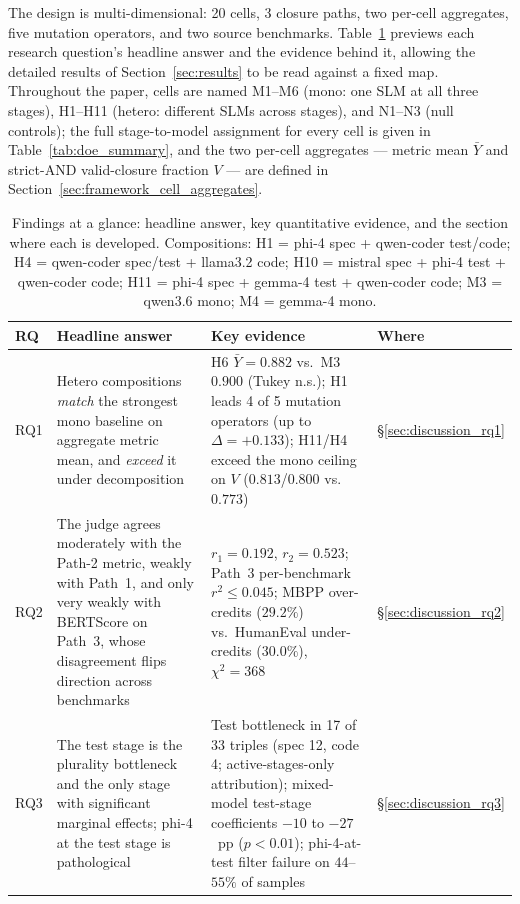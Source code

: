 The design is multi-dimensional: 20 cells, 3 closure paths, two per-cell aggregates, five mutation operators, and two source benchmarks. Table~\ref{tab:findings_glance} previews each research question's headline answer and the evidence behind it, allowing the detailed results of Section~\ref{sec:results} to be read against a fixed map. Throughout the paper, cells are named M1--M6 (mono: one SLM at all three stages), H1--H11 (hetero: different SLMs across stages), and N1--N3 (null controls); the full stage-to-model assignment for every cell is given in Table~\ref{tab:doe_summary}, and the two per-cell aggregates --- metric mean $\bar{Y}$ and strict-AND valid-closure fraction $V$ --- are defined in Section~\ref{sec:framework_cell_aggregates}.

\begin{table}[!htbp]
\centering
\small
\caption{Findings at a glance: headline answer, key quantitative evidence, and the section where each is developed. Compositions: H1 = phi-4 spec + qwen-coder test/code; H4 = qwen-coder spec/test + llama3.2 code; H10 = mistral spec + phi-4 test + qwen-coder code; H11 = phi-4 spec + gemma-4 test + qwen-coder code; M3 = qwen3.6 mono; M4 = gemma-4 mono.}
\label{tab:findings_glance}
\begin{tabular}{@{}p{0.55cm}p{4.9cm}p{4.9cm}p{1.1cm}@{}}
\toprule
RQ & Headline answer & Key evidence & Where \\
\midrule
RQ1 & Hetero compositions \emph{match} the strongest mono baseline on aggregate metric mean, and \emph{exceed} it under decomposition & H6 $\bar{Y} = 0.882$ vs.\ M3 $0.900$ (Tukey n.s.); H1 leads 4 of 5 mutation operators (up to $\Delta = +0.133$); H11/H4 exceed the mono ceiling on $V$ ($0.813$/$0.800$ vs.\ $0.773$) & \S\ref{sec:discussion_rq1} \\
\addlinespace
RQ2 & The judge agrees moderately with the Path-2 metric, weakly with Path~1, and only very weakly with BERTScore on Path~3, whose disagreement flips direction across benchmarks & $r_1 = 0.192$, $r_2 = 0.523$; Path~3 per-benchmark $r^2 \leq 0.045$; MBPP over-credits ($29.2\%$) vs.\ HumanEval under-credits ($30.0\%$), $\chi^2 = 368$ & \S\ref{sec:discussion_rq2} \\
\addlinespace
RQ3 & The test stage is the plurality bottleneck and the only stage with significant marginal effects; phi-4 at the test stage is pathological & Test bottleneck in 17 of 33 triples (spec 12, code 4; active-stages-only attribution); mixed-model test-stage coefficients $-10$ to $-27$~pp ($p < 0.01$); phi-4-at-test filter failure on $44$--$55\%$ of samples & \S\ref{sec:discussion_rq3} \\

\end{tabular}
\end{table}
